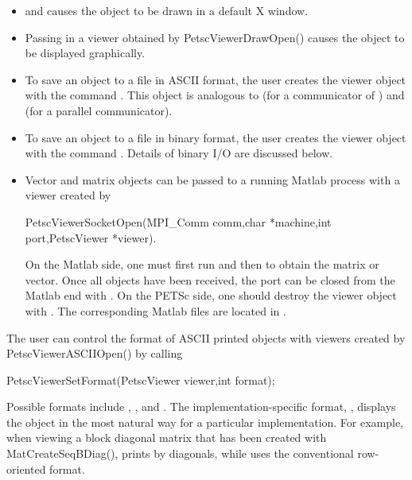 {{{\begin{itemize}
\item {}  and 
        causes the 
      object to be drawn in a default X window.
\item Passing in a viewer obtained by
      PetscViewerDrawOpen() causes the object to be displayed graphically.
\item To save an object to a file in ASCII format, the user creates
      the viewer object with the command
      .  
      This object is 
      analogous to  (for a communicator of
      ) and 
       (for a parallel communicator).
\item To save an object to a file in binary format, the user creates
      the viewer object with the command
        .   Details of binary
      I/O are discussed below.
\item Vector and matrix objects can be passed to a running Matlab process
      with a viewer created by 
\begin{tabbing}
     PetscViewerSocketOpen(MPI\_Comm comm,char *machine,int port,PetscViewer *viewer). 
\end{tabbing} 
      On the Matlab side, one must first run 
      and then  to obtain the matrix or vector. Once all
      objects have been received, the port can be closed from the Matlab end
      with . On the PETSc side, one should destroy
      the viewer object with  . The corresponding Matlab 
      files are located in .
\end{itemize}

The user can control the format of ASCII printed objects with viewers 
created by PetscViewerASCIIOpen() by calling
\begin{tabbing}
  PetscViewerSetFormat(PetscViewer viewer,int format);
\end{tabbing}  
  
 
Possible formats include 
, , and
.  The implementation-specific format, 
, displays the object in the most natural way
for a particular implementation.  For example, when viewing a block 
diagonal matrix that has been created with MatCreateSeqBDiag(),
 prints by diagonals, while 
uses the conventional row-oriented format.

}}}
